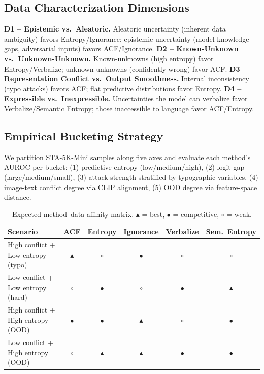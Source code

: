\documentclass[preprint,12pt]{elsarticle}
\begin{document}
\subsection{Data Characterization Dimensions}

\textbf{D1 -- Epistemic vs.\ Aleatoric.} Aleatoric uncertainty (inherent data ambiguity) favors Entropy/Ignorance; epistemic uncertainty (model knowledge gaps, adversarial inputs) favors ACF/Ignorance. \textbf{D2 -- Known-Unknown vs.\ Unknown-Unknown.} Known-unknowns (high entropy) favor Entropy/Verbalize; unknown-unknowns (confidently wrong) favor ACF. \textbf{D3 -- Representation Conflict vs.\ Output Smoothness.} Internal inconsistency (typo attacks) favors ACF; flat predictive distributions favor Entropy. \textbf{D4 -- Expressible vs.\ Inexpressible.} Uncertainties the model can verbalize favor Verbalize/Semantic Entropy; those inaccessible to language favor ACF/Entropy.

\subsection{Empirical Bucketing Strategy}

We partition STA-5K-Mini samples along five axes and evaluate each method's AUROC per bucket: (1) predictive entropy (low/medium/high), (2) logit gap (large/medium/small), (3) attack strength stratified by typographic variables, (4) image-text conflict degree via CLIP alignment, (5) OOD degree via feature-space distance.

\begin{table}[t]
\centering
\caption{Expected method--data affinity matrix. $\blacktriangle$ = best, $\bullet$ = competitive, $\circ$ = weak.}
\label{tab:affinity_expected}
\setlength{\tabcolsep}{3pt}
\begin{tabular}{@{}l ccccc@{}}
\toprule
Scenario & ACF & Entropy & Ignorance & Verbalize & Sem.\ Entropy \\
\midrule
High conflict + Low entropy (typo) & $\blacktriangle$ & $\circ$ & $\bullet$ & $\circ$ & $\circ$ \\
Low conflict + Low entropy (hard)  & $\circ$ & $\bullet$ & $\circ$ & $\bullet$ & $\blacktriangle$ \\
High conflict + High entropy (OOD) & $\bullet$ & $\bullet$ & $\blacktriangle$ & $\circ$ & $\bullet$ \\
Low conflict + High entropy (OOD)  & $\circ$ & $\blacktriangle$ & $\blacktriangle$ & $\bullet$ & $\bullet$ \\
\bottomrule
\end{tabular}
\end{table}
\end{document}
